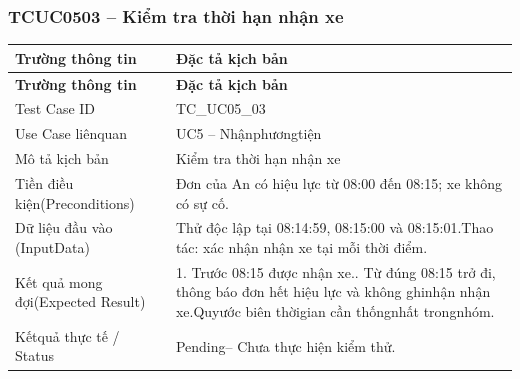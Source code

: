 \subsubsection{TCUC0503 – Kiểm tra thời hạn nhận xe}
\begin{longtable}{|L{0.24\textwidth}|L{0.70\textwidth}|}
\hline
\textbf{Trường thông tin} & \textbf{Đặc tả kịch bản} \\
\hline
\endfirsthead
\hline
\textbf{Trường thông tin} & \textbf{Đặc tả kịch bản} \\
\hline
\endhead
Test Case ID & TC\_UC05\_03 \\
\hline
Use Case liênquan & UC5 – Nhậnphươngtiện \\
\hline
Mô tả kịch bản & Kiểm tra thời hạn nhận xe \\
\hline
Tiền điều kiện\newline (Preconditions) & Đơn của An có hiệu lực từ 08:00 đến 08:15; xe không có sự cố. \\
\hline
Dữ liệu đầu vào (Input\newline Data) & Thử độc lập tại 08:14:59, 08:15:00 và 08:15:01.\newline Thao tác: xác nhận nhận xe tại mỗi thời điểm. \\
\hline
Kết quả mong đợi\newline (Expected Result) & 1. Trước 08:15 được nhận xe.. Từ đúng 08:15 trở đi, thông báo đơn hết hiệu lực và không ghi\newline nhận nhận xe.Quyước biên thờigian cần thốngnhất trongnhóm. \\
\hline
Kếtquả thực tế / Status & Pending– Chưa thực hiện kiểm thử. \\
\hline
\end{longtable}
\vspace{-0.5\baselineskip}
